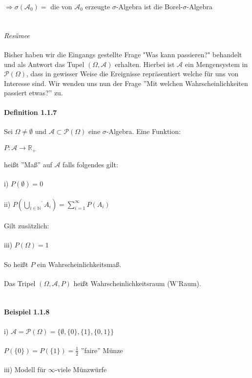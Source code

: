 \documentclass[10pt,a4paper]{report}
\numberwithin{equation}{section}
\numberwithin{figure}{section}
\theoremstyle{plain}
\theoremstyle{definition}
\theoremstyle{plain}
\theoremstyle{definition}
\theoremstyle{remark}
\theoremstyle{plain}
\theoremstyle{plain}
\theoremstyle{plain}
\newcommand{\1}{ \mathbb{1} } %
\begin{document}
$\Rightarrow \sigma(\mathcal{A}_0)=$ die von $\mathcal{A}_0$ erzeugte $\sigma$-Algebra ist die Borel-$\sigma$-Algebra\\\\\\
\textit{Resümee}\\\\
Bisher haben wir die Eingangs gestellte Frage "Was kann passieren?" behandelt und als Antwort das Tupel $(\Omega,\mathcal{A})$ erhalten. Hierbei ist $\mathcal{A}$ ein Mengensystem in $\mathcal{P}(\Omega)$, dass in gewisser Weise die Ereignisse repräsentiert welche für uns von Interesse sind. Wir wenden uns nun der Frage ''Mit welchen Wahrscheinlichkeiten passiert etwas?'' zu.\\\\
\textbf{Definition 1.1.7}\\\\
Sei $\Omega \neq \emptyset$ und $\mathcal{A}\subset \mathcal{P}(\Omega)$ eine $\sigma$-Algebra. Eine Funktion:\begin{center}
$P: \mathcal{A} \rightarrow \mathbb{R}_+$
\end{center}
heißt ''Maß'' auf $\mathcal{A}$ falls folgendes gilt:\\\\
i) $P(\emptyset)=0$\\\\
ii) $P\left(\stackrel{\cdot}{\bigcup\limits_{i \in \mathbb{N}}}A_i\right)=\sum\limits_{i=1}^\infty P(A_i)$\\\\
Gilt zusätzlich:\\\\
iii) $P(\Omega)=1$\\\\
So heißt $P$ ein Wahrscheinlichkeitsmaß.\\\\
Das Tripel $(\Omega,\mathcal{A},P)$ heißt Wahrscheinlichkeitsraum (W'Raum).\\\\\\
\textbf{Beispiel 1.1.8}\\\\
i) $\mathcal{A}=\mathcal{P}(\Omega)=\{\emptyset,\{0\},\{1\},\{0,1\}\}$\\\\
\qquad $P(\{0\})=P(\{1\})=\frac{1}{2}$ \qquad ''faire'' Münze\\\\
iii) Modell für $\infty$-viele Münzwürfe\\\\
\end{document}
